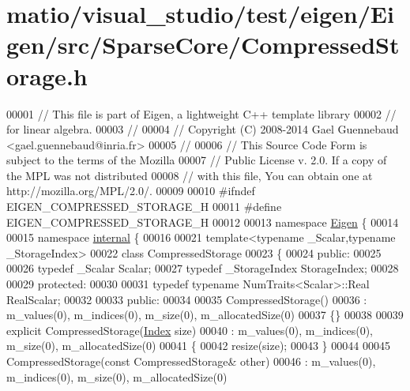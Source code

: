 \hypertarget{matio_2visual__studio_2test_2eigen_2_eigen_2src_2_sparse_core_2_compressed_storage_8h_source}{}\section{matio/visual\+\_\+studio/test/eigen/\+Eigen/src/\+Sparse\+Core/\+Compressed\+Storage.h}
\label{matio_2visual__studio_2test_2eigen_2_eigen_2src_2_sparse_core_2_compressed_storage_8h_source}

\begin{DoxyCode}
00001 \textcolor{comment}{// This file is part of Eigen, a lightweight C++ template library}
00002 \textcolor{comment}{// for linear algebra.}
00003 \textcolor{comment}{//}
00004 \textcolor{comment}{// Copyright (C) 2008-2014 Gael Guennebaud <gael.guennebaud@inria.fr>}
00005 \textcolor{comment}{//}
00006 \textcolor{comment}{// This Source Code Form is subject to the terms of the Mozilla}
00007 \textcolor{comment}{// Public License v. 2.0. If a copy of the MPL was not distributed}
00008 \textcolor{comment}{// with this file, You can obtain one at http://mozilla.org/MPL/2.0/.}
00009 
00010 \textcolor{preprocessor}{#ifndef EIGEN\_COMPRESSED\_STORAGE\_H}
00011 \textcolor{preprocessor}{#define EIGEN\_COMPRESSED\_STORAGE\_H}
00012 
00013 \textcolor{keyword}{namespace }\hyperlink{namespace_eigen}{Eigen} \{ 
00014 
00015 \textcolor{keyword}{namespace }\hyperlink{namespaceinternal}{internal} \{
00016 
00021 \textcolor{keyword}{template}<\textcolor{keyword}{typename} \_Scalar,\textcolor{keyword}{typename} \_StorageIndex>
00022 \textcolor{keyword}{class }CompressedStorage
00023 \{
00024   \textcolor{keyword}{public}:
00025 
00026     \textcolor{keyword}{typedef} \_Scalar Scalar;
00027     \textcolor{keyword}{typedef} \_StorageIndex StorageIndex;
00028 
00029   \textcolor{keyword}{protected}:
00030 
00031     \textcolor{keyword}{typedef} \textcolor{keyword}{typename} NumTraits<Scalar>::Real RealScalar;
00032 
00033   \textcolor{keyword}{public}:
00034 
00035     CompressedStorage()
00036       : m\_values(0), m\_indices(0), m\_size(0), m\_allocatedSize(0)
00037     \{\}
00038 
00039     \textcolor{keyword}{explicit} CompressedStorage(\hyperlink{namespace_eigen_a62e77e0933482dafde8fe197d9a2cfde}{Index} size)
00040       : m\_values(0), m\_indices(0), m\_size(0), m\_allocatedSize(0)
00041     \{
00042       resize(size);
00043     \}
00044 
00045     CompressedStorage(\textcolor{keyword}{const} CompressedStorage& other)
00046       : m\_values(0), m\_indices(0), m\_size(0), m\_allocatedSize(0)

\end{DoxyCode}
